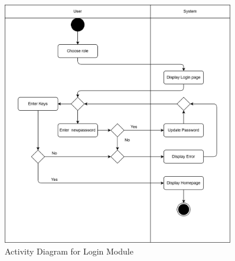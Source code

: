 \begin{figure}[htbp]
    \centering
    \includegraphics[width=0.9\textwidth]{Images/Activity/Login_activity.png}
    \caption{Activity Diagram for Login Module}
\end{figure}

\newpage
